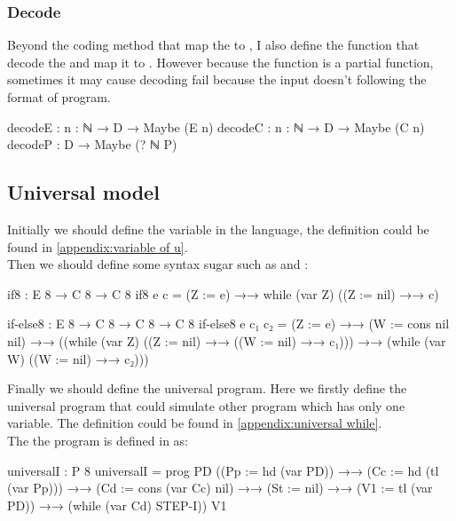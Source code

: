 \subsubsection{Decode}
Beyond the coding method that map the  to , I also define the function that decode the  and map it to .
However because the function  is a partial function, sometimes it may cause decoding fail because the input  doesn't following the format of program.
\begin{code}
decodeE : {n : ℕ} → D → Maybe (E n)
decodeC : {n : ℕ} → D → Maybe (C n)
decodeP : D → Maybe (? ℕ P)
\end{code}
\subsection{Universal \WHILE model}
Initially we should define the variable in the \WHILE language, the definition could be found in \ref{appendix:variable of u}.\\
Then we should define some syntax sugar such as  and :
\begin{code}[fontsize=\footnotesize]
if8 : E 8 → C 8 → C 8
if8 e c = (Z := e) →→ while (var Z) ((Z := nil) →→ c)

if-else8 : E 8 → C 8 → C 8 → C 8
if-else8 e c₁ c₂ = (Z := e) →→
                   (W := cons nil nil) →→
                   ((while (var Z)
                           ((Z := nil) →→
                           ((W := nil) →→
                           c₁))) →→
                   (while (var W)
                          ((W := nil) →→
                          c₂)))
\end{code}
Finally we should define the universal \WHILE program.
Here we firstly define the universal \WHILE program that could simulate other \WHILE program which has only one variable.
The definition could be found in \ref{appendix:universal while}.\\
The the program is defined in \Agda as:
\begin{code}
universalI : P 8
universalI = prog PD ((Pp := hd (var PD))
                     →→
                     (Cc := hd (tl (var Pp)))
                     →→
                     (Cd := cons (var Cc) nil)
                     →→
                     (St := nil)
                     →→
                     (V1 := tl (var PD))
                     →→
                     (while (var Cd) STEP-I))
                  V1
\end{code}

